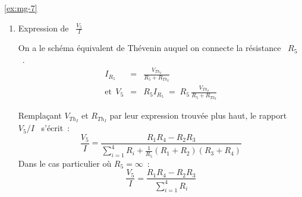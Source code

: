 \begin{solexercise}{\ref{ex:mg-7}}
\begin{enumerate}
\item  Expression de \ $\frac{V_5}{I}$

On a le schéma équivalent de Thévenin auquel on connecte la résistance \ $R_5$~.
\begin{eqnarray*} 
	I_{R_5} &=& \frac{V_{{Th}_I}}{R_5+R_{{Th}_I}} \\ 
	\mbox{et}~~V_5 &=& R_5
	I_{R_5} \; = \; R_5 \, \frac{V_{{Th}_I}}{R_5+R_{{Th}_I}} 
\end{eqnarray*}	

Remplaçant $V_{{Th}_I}$ et $R_{{Th}_I}$ par leur expression trouvée plus haut, le rapport \ $V_5/I$ \ s'écrit~:
\[\frac{V_5}{I}=\frac{R_1R_4-R_2R_3}{\sum_{i=1}^4R_i+\frac{1}{R_5} (R_1+R_2)(R_3+R_4)}\]
Dans le cas particulier où $R_5=\infty$~:
\[\frac{V_5}{I}=\frac{R_1R_4-R_2R_3}{\sum_{i=1}^4R_i}\]
	
\end{enumerate}
\end{solexercise}

